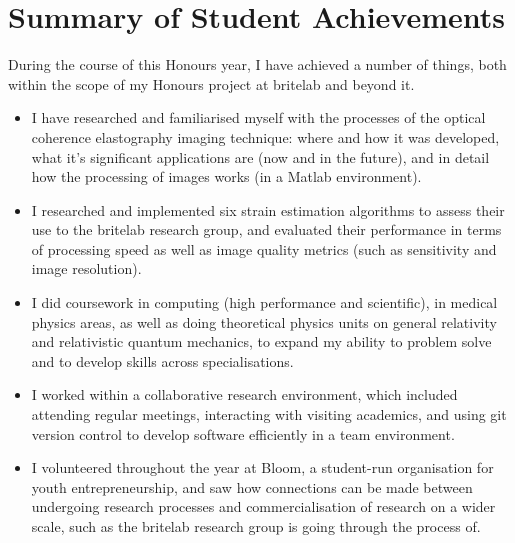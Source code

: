 \chapter{Summary of Student Achievements}

During the course of this Honours year, I have achieved a number of things, both within the scope of my Honours project at \ac{britelab} and beyond it. 

\begin{itemize}

\item I have researched and familiarised myself with the processes of the optical coherence elastography imaging technique: where and how it was developed, what it's significant applications are (now and in the future), and in detail how the processing of images works (in a Matlab environment). 

\item I researched and implemented six strain estimation algorithms to assess their use to the \ac{britelab} research group, and evaluated their performance in terms of processing speed as well as image quality metrics (such as sensitivity and image resolution).

\item I did coursework in computing (high performance and scientific), in medical physics areas, as well as doing theoretical physics units on general relativity and relativistic quantum mechanics, to expand my ability to problem solve and to develop skills across specialisations. 

\item I worked within a collaborative research environment, which included attending regular meetings, interacting with visiting academics, and using git version control to develop software efficiently in a team environment.

\item I volunteered throughout the year at Bloom, a student-run organisation for youth entrepreneurship, and saw how connections can be made between undergoing research processes and commercialisation of research on a wider scale, such as the \ac{britelab} research group is going through the process of.

\end{itemize}
